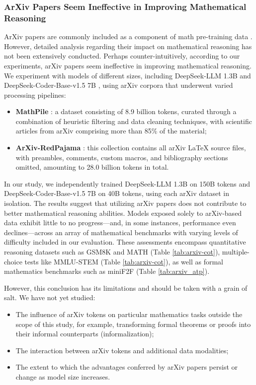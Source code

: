 \begin{itemize}[topsep=0pt]
\begin{itemize}[topsep=0pt]
\subsubsection{ArXiv Papers Seem Ineffective in Improving Mathematical Reasoning}

ArXiv papers are commonly included as a component of math pre-training data \citep{minerva,gpt-f,llemma,mathpile}. However, detailed analysis regarding their impact on mathematical reasoning has not been extensively conducted. Perhaps counter-intuitively, according to our experiments, arXiv papers seem ineffective in improving mathematical reasoning. We experiment with models of different sizes, including DeepSeek-LLM 1.3B and DeepSeek-Coder-Base-v1.5 7B \citep{deepseek-coder}, using arXiv corpora that underwent varied processing pipelines:

\begin{itemize}[topsep=0pt]
    \item \textbf{MathPile} \citep{mathpile}: a dataset consisting of 8.9 billion tokens, curated through a combination of heuristic filtering and data cleaning techniques, with scientific articles from arXiv comprising more than 85\% of the material;
    \item \textbf{ArXiv-RedPajama} \citep{redpajama}: this collection contains all arXiv LaTeX source files, with preambles, comments, custom macros, and bibliography sections omitted, amounting to 28.0 billion tokens in total.
\end{itemize}

In our study, we independently trained DeepSeek-LLM 1.3B on 150B tokens and DeepSeek-Coder-Base-v1.5 7B on 40B tokens, using each arXiv dataset in isolation. The results suggest that utilizing arXiv papers does not contribute to better mathematical reasoning abilities. Models exposed solely to arXiv-based data exhibit little to no progress—and, in some instances, performance even declines—across an array of mathematical benchmarks with varying levels of difficulty included in our evaluation. These assessments encompass quantitative reasoning datasets such as GSM8K and MATH (Table \ref{tab:arxiv-cot}), multiple-choice tests like MMLU-STEM (Table \ref{tab:arxiv-cot}), as well as formal mathematics benchmarks such as miniF2F (Table \ref{tab:arxiv_atp}).

However, this conclusion has its limitations and should be taken with a grain of salt. We have not yet studied:

\begin{itemize}[topsep=0pt]
    \item The influence of arXiv tokens on particular mathematics tasks outside the scope of this study, for example, transforming formal theorems or proofs into their informal counterparts (informalization);
    \item The interaction between arXiv tokens and additional data modalities;
    \item The extent to which the advantages conferred by arXiv papers persist or change as model size increases.
\end{itemize}


\end{itemize}
\end{itemize}
